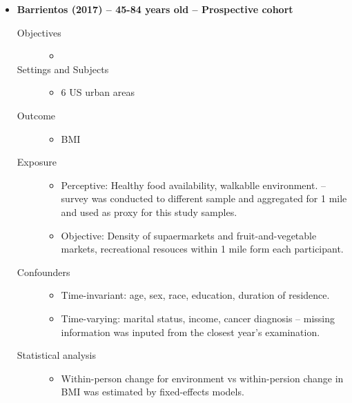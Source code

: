 \documentclass{article}
\begin{document}
\begin{itemize}
    \item {\bf Barrientos (2017)  -- 45-84 years old -- Prospective cohort}
		\begin{description}
			\item[Objectives] \mbox{}\par
				\begin{itemize}
					\item 
				\end{itemize}
			\item[Settings and Subjects] \mbox{}\par
				\begin{itemize}
					\item 6 US urban areas
				\end{itemize}
			\item[Outcome] \mbox{}\par
				\begin{itemize}
					\item BMI
				\end{itemize}
			\item[Exposure] \mbox{}\par
				\begin{itemize}
					\item Perceptive: Healthy food availability, walkablle environment. -- survey was conducted to different sample and aggregated for 1 mile and used as proxy for this study samples. 
					\item Objective: Density of supaermarkets and fruit-and-vegetable markets, recreational resouces within 1 mile form each participant.
				\end{itemize}
			\item[Confounders] \mbox{}\par
				\begin{itemize}
					\item Time-invariant: age, sex, race, education, duration of residence. 
					\item Time-varying: marital status, income, cancer diagnosis -- missing information was inputed from the closest year's examination.  
				\end{itemize}
			\item[Statistical analysis] \mbox{}\par
				\begin{itemize}
					\item Within-person change for environment vs within-persion change in BMI was estimated by fixed-effects models. 

\end{itemize}
\end{description}
\end{itemize}
\end{document}
